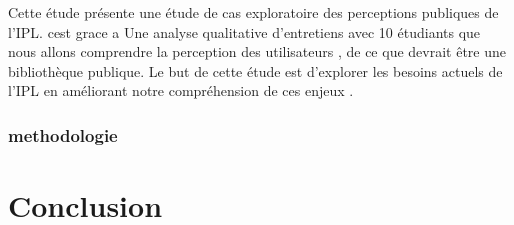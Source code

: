 \documentclass[french,a4paper,12pt]{article}
\begin{document}
\quad Cette étude présente une étude de cas exploratoire des perceptions publiques de l'IPL.  cest grace a Une analyse qualitative d'entretiens avec 10 étudiants que nous allons comprendre la perception des utilisateurs , de ce que devrait être une bibliothèque publique. Le but de cette étude est d'explorer les besoins actuels de l'IPL en améliorant notre compréhension de ces enjeux .

\subsubsection{ methodologie}

\newpage
\section{Conclusion}






\newpage
\begin{center}
\listoffigures
\end{center}

\newpage

\begin{center}

 
\end{center}
\end{document}
